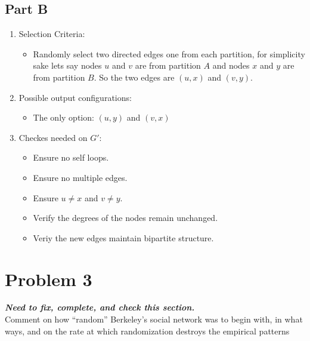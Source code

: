 \documentclass[12pt]{article}
\begin{document}
\subsection*{Part B}
\begin{enumerate}
    \item Selection Criteria:
    \begin{itemize}
        \item Randomly select two directed edges one from each partition, for simplicity sake lets say nodes \( u \) and \( v \) are from partition \( A \) and nodes \( x \) and \( y \) are from partition \( B \). So the two edges are \( (u,x) \) and \( (v,y) \).
    \end{itemize}
    \item Possible output configurations:
    \begin{itemize}
        \item The only option: \( (u, y)\) and \( (v, x) \)
    \end{itemize}
    \item Checkes needed on $G'$:   
    \begin{itemize}
        \item Ensure no self loops.
        \item Ensure no multiple edges.
        \item Ensure $u \neq x$ and $v \neq y$.
        \item Verify the degrees of the nodes remain unchanged.
        \item Veriy the new edges maintain bipartite structure.
    \end{itemize}
\end{enumerate}


\section*{Problem 3}

\textbf{\textit{Need to fix, complete, and check this section.}}\\

Comment on how ``random” Berkeley’s social network was to begin with, in what ways, and
on the rate at which randomization destroys the empirical patterns
\end{document}
